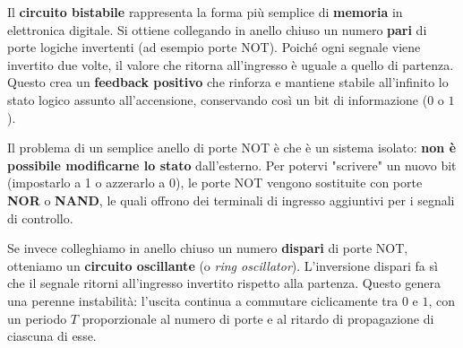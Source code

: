 Il \textbf{circuito bistabile} rappresenta la forma più semplice di \textbf{memoria} in elettronica digitale. Si ottiene collegando in anello chiuso un numero \textbf{pari} di porte logiche invertenti (ad esempio porte NOT). Poiché ogni segnale viene invertito due volte, il valore che ritorna all'ingresso è uguale a quello di partenza. Questo crea un \textbf{feedback positivo} che rinforza e mantiene stabile all'infinito lo stato logico assunto all'accensione, conservando così un bit di informazione ($0$ o $1$).

\begin{important}
Il problema di un semplice anello di porte NOT è che è un sistema isolato: \textbf{non è possibile modificarne lo stato} dall'esterno. Per potervi "scrivere" un nuovo bit (impostarlo a 1 o azzerarlo a 0), le porte NOT vengono sostituite con porte \textbf{NOR} o \textbf{NAND}, le quali offrono dei terminali di ingresso aggiuntivi per i segnali di controllo.
\end{important}

Se invece colleghiamo in anello chiuso un numero \textbf{dispari} di porte NOT, otteniamo un \textbf{circuito oscillante} (o \emph{ring oscillator}). L'inversione dispari fa sì che il segnale ritorni all'ingresso invertito rispetto alla partenza. Questo genera una perenne instabilità: l'uscita continua a commutare ciclicamente tra $0$ e $1$, con un periodo $T$ proporzionale al numero di porte e al ritardo di propagazione di ciascuna di esse.

